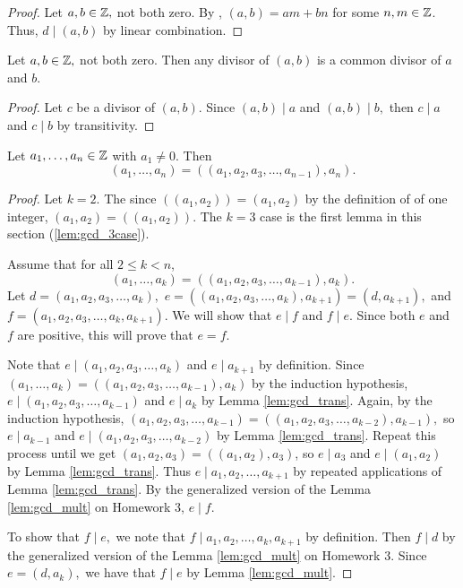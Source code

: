 \documentclass{ximera}
\begin{document}
 \begin{proof}
 	Let $a,b\in\mathbb Z,$ not both zero. By , $(a,b)=am+bn$ for some $n,m\in\mathbb Z$. Thus, $d\mid (a,b)$ by linear combination.
 \end{proof}

\begin{lemma}\label{lem:gcd_trans}
 	Let $a,b\in\mathbb Z,$ not both zero. Then any divisor of $(a,b)$ is a common divisor of $a$ and $b$.
\end{lemma}

\begin{proof}
 Let $c$ be a divisor of $(a,b)$. Since $(a,b)\mid a$ and $(a,b )\mid b,$ then $c\mid a$ and $c\mid b$ by transitivity.
\end{proof}


\begin{proposition}
 Let $a_1,\dots,a_n\in\mathbb Z$ with $a_1\neq 0$.  Then 
	\[(a_1,\dots,a_n)=((a_1,a_2,a_3,\dots,a_{n-1}),a_n).\]
\end{proposition}
\begin{proof}
 Let $k=2$. The since $((a_1,a_2))=(a_1,a_2)$ by the definition of  of one integer,  $(a_1,a_2)=((a_1,a_2))$. The $k=3$ case is the first lemma in this section (\ref{lem:gcd_3case}).
 
 Assume that for all $2\leq k< n$, 
 	\[(a_1,\dots,a_k)=((a_1,a_2,a_3,\dots,a_{k-1}),a_k).\]
Let $d=(a_1,a_2,a_3,\dots,a_{k}),$
$e=((a_1,a_2,a_3,\dots,a_{k}),a_{k+1})=(d,a_{k+1}),$ and $f= (a_1,a_2,a_3,\dots,a_{k},a_{k+1}).$ We will show that $e\mid f$ and $f\mid e$. Since both $e$ and $f$ are positive, this will prove that $e=f$.

Note that $e\mid (a_1,a_2,a_3,\dots,a_{k})$ and $e\mid a_{k+1}$ by definition. 
Since $(a_1,\dots,a_k)=((a_1,a_2,a_3,\dots,a_{k-1}),a_k)$ by the induction hypothesis, $e\mid(a_1,a_2,a_3,\dots,a_{k-1})$ and $e\mid a_k$ by Lemma \ref{lem:gcd_trans}. Again, by the induction hypothesis, $(a_1,a_2,a_3,\dots,a_{k-1})=((a_1,a_2,a_3,\dots,a_{k-2}),a_{k-1}),$ so $e\mid a_{k-1}$ and $e\mid (a_1,a_2,a_3,\dots,a_{k-2})$ by Lemma \ref{lem:gcd_trans}. Repeat this process until we get $(a_1,a_2,a_3)=((a_1,a_2),a_3)$, so $e\mid a_3$ and $e\mid (a_1,a_2)$ by Lemma \ref{lem:gcd_trans}. Thus $e\mid a_1,a_2,\dots,a_{k+1}$ by repeated applications of Lemma \ref{lem:gcd_trans}. By the generalized version of the Lemma \ref{lem:gcd_mult} on Homework 3, $e\mid f.$

To show that $f\mid e,$ we note that $f\mid a_1,a_2,\dots, a_k,a_{k+1}$ by definition. Then $f\mid d$ by the generalized version of the Lemma \ref{lem:gcd_mult} on Homework 3. Since $e=(d,a_k),$ we have that $f\mid e$ by Lemma \ref{lem:gcd_mult}.
\end{proof} 
\end{document}
